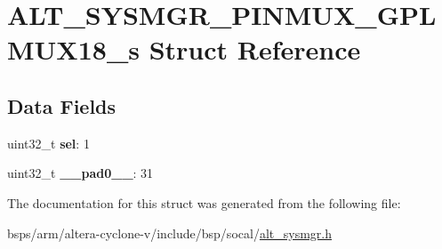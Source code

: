 \hypertarget{structALT__SYSMGR__PINMUX__GPLMUX18__s}{}\section{A\+L\+T\+\_\+\+S\+Y\+S\+M\+G\+R\+\_\+\+P\+I\+N\+M\+U\+X\+\_\+\+G\+P\+L\+M\+U\+X18\+\_\+s Struct Reference}
\label{structALT__SYSMGR__PINMUX__GPLMUX18__s}
\subsection*{Data Fields}
\begin{DoxyCompactItemize}
\item 
\mbox{\label{structALT__SYSMGR__PINMUX__GPLMUX18__s_a12f17e3d5e35055ce46b858346314cbc}} 
uint32\+\_\+t {\bfseries sel}\+: 1
\item 
\mbox{\label{structALT__SYSMGR__PINMUX__GPLMUX18__s_a9984579491d5258e3be1a7e4f43e2c57}} 
uint32\+\_\+t {\bfseries \+\_\+\+\_\+pad0\+\_\+\+\_\+}\+: 31
\end{DoxyCompactItemize}


The documentation for this struct was generated from the following file\+:\begin{DoxyCompactItemize}
\item 
bsps/arm/altera-\/cyclone-\/v/include/bsp/socal/\mbox{\hyperlink{alt__sysmgr_8h}{alt\+\_\+sysmgr.\+h}}\end{DoxyCompactItemize}
